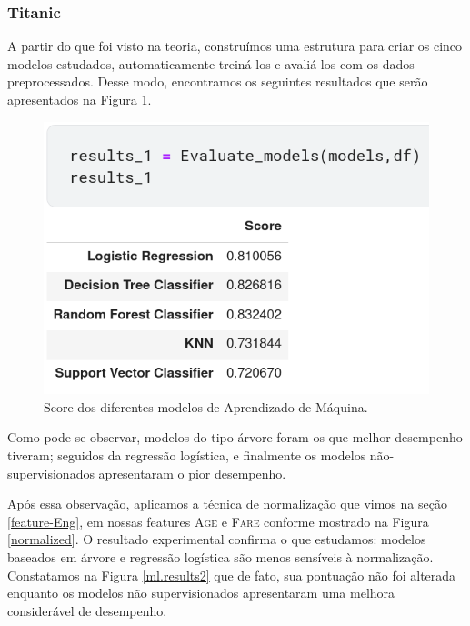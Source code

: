 \documentclass{article}
\begin{document}
\subsubsection{Titanic}
A partir do que foi visto na teoria, construímos uma estrutura para criar os cinco modelos estudados, automaticamente treiná-los e avaliá los com os dados preprocessados. Desse modo, encontramos os seguintes resultados que serão apresentados na Figura \ref{ml.results}.
\begin{figure}[H]
\centering
\includegraphics[width=\textwidth]{Figures/results_1.png}
\caption{\label{ml.results}Score dos diferentes modelos de Aprendizado de Máquina.}
\end{figure}

Como pode-se observar, modelos do tipo árvore foram os que melhor desempenho tiveram; seguidos da regressão logística, e finalmente os modelos não-supervisionados apresentaram o pior desempenho.

Após essa observação, aplicamos a técnica de normalização que vimos na seção \ref{feature-Eng}, em nossas features \textsc{Age} e \textsc{Fare} conforme mostrado na Figura \ref{normalized}. O resultado experimental confirma o que estudamos: modelos baseados em árvore e regressão logística são menos sensíveis à normalização. Constatamos na Figura \ref{ml.results2} que de fato, sua pontuação não foi alterada enquanto os modelos não supervisionados apresentaram uma melhora considerável de desempenho. 
\end{document}

